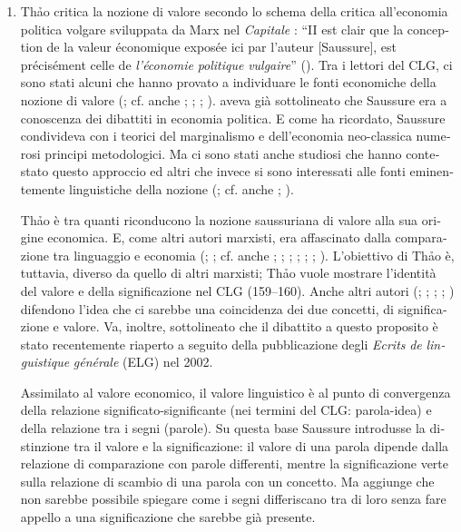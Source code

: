 \documentclass[italian,output=paper,colorlinks,citecolor=brown]{../langscibook}
\begin{document}
\begin{otherlanguage}{italian}
\begin{enumerate}
\item Th\textlatin{ả}o critica la nozione di valore secondo lo schema della critica all’economia politica volgare sviluppata da Marx nel \textit{Capitale} \citep{Marx1867}: “II est clair que la conception de la valeur économique exposée ici par l’auteur [Saussure], est précisément celle de \textit{l’économie} \textit{politique} \textit{vulgaire}” (\citealt[42]{Thao1974}). Tra i lettori del CLG, ci sono stati alcuni che hanno provato a individuare le fonti economiche della nozione di valore (\citealt[68]{Koerner1973}; cf. anche \citealt[541]{Sljusareva1980}; \citealt[2]{Ponzio2005}; \citealt{Ponzio2015}; \citealt{Joseph2014}). \citet[n. 165]{De-Mauro2011} aveva già sottolineato che Saussure era a conoscenza dei dibattiti in economia politica. E come \citet{Ponzio2005} ha ricordato, Saussure condivideva con i teorici del marginalismo e dell’economia neo-classica numerosi principi metodologici. Ma ci sono stati anche studiosi che hanno contestato questo approccio \citep[235]{Godel1957} ed altri che invece si sono interessati alle fonti eminentemente linguistiche della nozione (\citealt[295]{Auroux1985}; cf. anche \citealt[329]{Swiggers1982}; \citealt{Haßler2007}). 

Th\textlatin{ả}o è tra quanti riconducono la nozione saussuriana di valore alla sua origine economica. E, come altri autori marxisti, era affascinato dalla comparazione tra linguaggio e economia (\citealt{Lefebvre1966}; \citealt{Goux1968}; cf. anche \citealt[207]{Schaff1968}; \citealt{Baudrillard1972}; \citealt{Latouche1973}; \citealt{Bourdieu1977}; \citealt[180--181]{Rossi-Landi2016}; \citealt{Rossi-Landi2003}; \citeyear{Rossi-Landi1977}). L’obiettivo di Th\textlatin{ả}o è, tuttavia, diverso da quello di altri marxisti; Th\textlatin{ả}o vuole mostrare l’identità del valore e della significazione nel CLG (159--160). Anche altri autori (\citealt[437]{Malmkjær1991}; \citealt[III, 406]{Bright1992}; \citealt[91]{Bouquet1992}; \citealt[317]{Bouquet1997}; \citealt{Rastier2002}) difendono l’idea che ci sarebbe una coincidenza dei due concetti, di significazione e valore. Va, inoltre, sottolineato che il dibattito a questo proposito è stato recentemente riaperto a seguito della pubblicazione degli \textit{Ecrits} \textit{de} \textit{linguistique} \textit{générale} (ELG) nel 2002.

Assimilato al valore economico, il valore linguistico è al punto di convergenza della relazione significato-significante (nei termini del CLG: parola-idea) e della relazione tra i segni (parole). Su questa base Saussure introdusse la distinzione tra il valore e la significazione: il valore di una parola dipende dalla relazione di comparazione con parole differenti, mentre la significazione verte sulla relazione di scambio di una parola con un concetto. Ma \citet[42]{Thao1974} aggiunge che non sarebbe possibile spiegare come i segni differiscano tra di loro senza fare appello a una significazione che sarebbe già presente.


\end{enumerate}
\end{otherlanguage}
\end{document}
